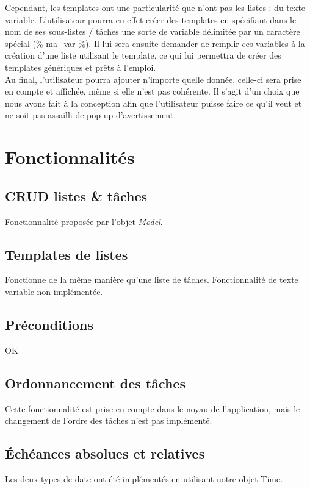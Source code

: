 		Cependant, les templates ont une particularité que n'ont pas les listes : du texte variable. L'utilisateur pourra en effet créer des templates en spécifiant dans le nom de ses sous-listes / tâches une sorte de variable délimitée par un caractère spécial (\% ma\_var \%). Il lui sera ensuite demander de remplir ces variables à la création d'une liste utilisant le template, ce qui lui permettra de créer des templates génériques et prêts à l'emploi.\\
		
		Au final, l'utilisateur pourra ajouter n'importe quelle donnée, celle-ci sera prise en compte et affichée, même si elle n'est pas cohérente. Il s'agit d'un choix que nous avons fait à la conception afin que l'utilisateur puisse faire ce qu'il veut et ne soit pas assailli de pop-up d'avertissement.
		
		
	\section{Fonctionnalités}
	
		\subsection{CRUD listes \& tâches}
			Fonctionnalité proposée par l'objet \emph{Model}.
			
		\subsection{Templates de listes}
			Fonctionne de la même manière qu'une liste de tâches. Fonctionnalité de texte variable non implémentée.
		
		\subsection{Préconditions}
			OK
			
		\subsection{Ordonnancement des tâches}
			Cette fonctionnalité est prise en compte dans le noyau de l'application, mais le changement de l'ordre des tâches n'est pas implémenté.
			
		\subsection{Échéances absolues et relatives}
			Les deux types de date ont été implémentés en utilisant notre objet Time.
		
